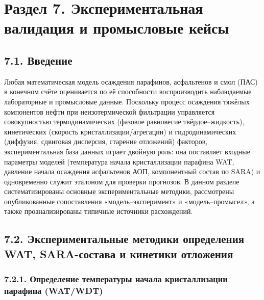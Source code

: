 \documentclass[11pt]{extarticle}
\begin{document}
\newpage

\section{Раздел 7. Экспериментальная валидация и промысловые кейсы}\label{ux440ux430ux437ux434ux435ux43b-7.-ux44dux43aux441ux43fux435ux440ux438ux43cux435ux43dux442ux430ux43bux44cux43dux430ux44f-ux432ux430ux43bux438ux434ux430ux446ux438ux44f-ux438-ux43fux440ux43eux43cux44bux441ux43bux43eux432ux44bux435-ux43aux435ux439ux441ux44b}

\subsection{7.1. Введение}\label{ux432ux432ux435ux434ux435ux43dux438ux435-1}

Любая математическая модель осаждения парафинов, асфальтенов и смол (ПАС) в конечном счёте оценивается по её способности воспроизводить наблюдаемые лабораторные и промысловые данные. Поскольку процесс осаждения тяжёлых компонентов нефти при неизотермической фильтрации управляется совокупностью термодинамических (фазовое равновесие твёрдое--жидкость), кинетических (скорость кристаллизации/агрегации) и гидродинамических (диффузия, сдвиговая дисперсия, старение отложений) факторов, экспериментальная база данных играет двойную роль: она поставляет входные параметры моделей (температура начала кристаллизации парафина WAT, давление начала осаждения асфальтенов АОП, компонентный состав по SARA) и одновременно служит эталоном для проверки прогнозов. В данном разделе систематизированы основные экспериментальные методики, рассмотрены опубликованные сопоставления «модель--эксперимент» и «модель--промысел», а также проанализированы типичные источники расхождений.

\subsection{7.2. Экспериментальные методики определения WAT, SARA-состава и кинетики отложения}\label{ux44dux43aux441ux43fux435ux440ux438ux43cux435ux43dux442ux430ux43bux44cux43dux44bux435-ux43cux435ux442ux43eux434ux438ux43aux438-ux43eux43fux440ux435ux434ux435ux43bux435ux43dux438ux44f-wat-sara-ux441ux43eux441ux442ux430ux432ux430-ux438-ux43aux438ux43dux435ux442ux438ux43aux438-ux43eux442ux43bux43eux436ux435ux43dux438ux44f}

\subsubsection{7.2.1. Определение температуры начала кристаллизации парафина (WAT/WDT)}\label{ux43eux43fux440ux435ux434ux435ux43bux435ux43dux438ux435-ux442ux435ux43cux43fux435ux440ux430ux442ux443ux440ux44b-ux43dux430ux447ux430ux43bux430-ux43aux440ux438ux441ux442ux430ux43bux43bux438ux437ux430ux446ux438ux438-ux43fux430ux440ux430ux444ux438ux43dux430-watwdt}
\end{document}
